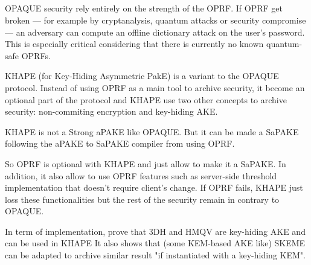 \documentclass[../report.tex]{subfiles}
\begin{document}
\subsection{}
\paragraph{}

OPAQUE security rely entirely on the strength of the OPRF. If OPRF get broken --- for example by cryptanalysis, quantum attacks or security compromise --- an adversary can compute an offline dictionary attack on the user's password. This is especially critical considering that there is currently no known quantum-safe OPRFs.

KHAPE (for Key-Hiding Asymmetric PakE) \cite{KHAPE_Paper} is a variant to the OPAQUE protocol. Instead of using OPRF as a main tool to archive security, it become an optional part of the protocol and KHAPE use two other concepts to archive security: non-commiting encryption and key-hiding AKE. %

KHAPE is not a Strong aPAKE like OPAQUE. But it can be made a SaPAKE following the aPAKE to SaPAKE compiler from \cite{OPAQUE_Paper} using OPRF.

So OPRF is optional with KHAPE and just allow to make it a SaPAKE. In addition, it also allow to use OPRF features such as server-side threshold implementation that doesn't require client's change. If OPRF fails, KHAPE just loss these functionalities but the rest of the security remain in contrary to OPAQUE.


In term of implementation, \cite{KHAPE_Paper} prove that 3DH and HMQV are key-hiding AKE and can be used in KHAPE %
It also shows that (some KEM-based AKE like) SKEME can be adapted to archive similar result "if instantiated with a key-hiding KEM". %


% 
% 
\end{document}
